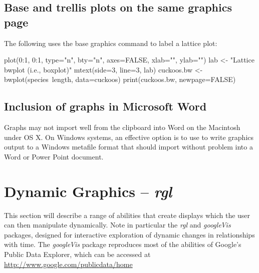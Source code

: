 \subsection*{Base and trellis plots on the same graphics page}

The following uses the base graphics command 
to label a lattice plot:
\begin{Schunk}
\begin{Sinput}
plot(0:1, 0:1, type="n", bty="n", axes=FALSE,
     xlab="", ylab="")
lab <- "Lattice bwplot (i.e., boxplot)"
mtext(side=3, line=3, lab)
cuckoos.bw <- bwplot(species~length, data=cuckoos)
print(cuckoos.bw, newpage=FALSE)
\end{Sinput}
\end{Schunk}

\subsection*{Inclusion of graphs in Microsoft Word}

Graphs may not import well from the clipboard into Word on the
Macintosh under OS X.  On Windows systems, an effective option is to
use  to write graphics output to a Windows
metafile format that should import without problem into a Word or
Power Point document.


\section{Dynamic Graphics -- \textit{rgl}}\label{sec:dynamicg}

This section will describe a range of abilities that create displays
which the user can then manipulate dynamically.  Note in particular
the {\em rgl} and {\em googleVis} packages, designed for interactive
exploration of dynamic changes in relationships with time.  The 
{\em googleVis} package reproduces most of the abilities of Google's
Public Data Explorer, which can be accessed at
\url{http://www.google.com/publicdata/home}



